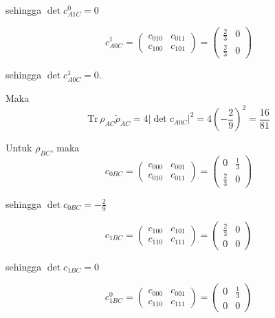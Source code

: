 \begin{enumerate}
	sehingga $\det c_{A1C}^0 = 0$
	
	\begin{equation}
		c_{A0C}^1=
		\begin{pmatrix}
			c_{010} & c_{011} \\
			c_{100} & c_{101}
		\end{pmatrix}=
		\begin{pmatrix}
			\frac{2}{3} & 0 \\
			\frac{2}{3} & 0
		\end{pmatrix}
	\end{equation}
	
	sehingga $\det c_{A0C}^1 = 0$.
	
	Maka
	\begin{equation}
		\mathrm{Tr}\,\rho_{AC}\tilde{\rho}_{AC}=4|\det c_{A0C}|^2=4(-\frac{2}{9})^2=\frac{16}{81}
	\end{equation}
	
	Untuk $\rho_{BC}$, maka
	\begin{equation}
		c_{0BC}=
		\begin{pmatrix}
			c_{000} & c_{001} \\
			c_{010} & c_{011}
		\end{pmatrix}=
		\begin{pmatrix}
			0 & \frac{1}{3} \\
			\frac{2}{3} & 0
		\end{pmatrix}
	\end{equation}
	
	sehingga $\det c_{0BC} = -\frac{2}{9}$
	
	\begin{equation}
		c_{1BC}=
		\begin{pmatrix}
			c_{100} & c_{101} \\
			c_{110} & c_{111}
		\end{pmatrix}=
		\begin{pmatrix}
			\frac{2}{3} & 0 \\
			0 & 0
		\end{pmatrix}
	\end{equation}
	
	sehingga $\det c_{1BC} = 0$
	
	\begin{equation}
		c_{1BC}^0=
		\begin{pmatrix}
			c_{000} & c_{001} \\
			c_{110} & c_{111}
		\end{pmatrix}=
		\begin{pmatrix}
			0 & \frac{1}{3} \\
			0 & 0
		\end{pmatrix}
	\end{equation}
	

\end{enumerate}
